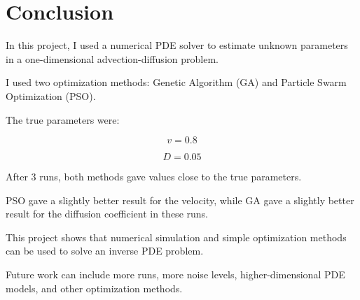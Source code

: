 \section{Conclusion}

In this project, I used a numerical PDE solver to estimate unknown parameters in a one-dimensional advection-diffusion problem.

I used two optimization methods: Genetic Algorithm (GA) and Particle Swarm Optimization (PSO).

The true parameters were:

\[
v = 0.8
\]

\[
D = 0.05
\]

After 3 runs, both methods gave values close to the true parameters.

PSO gave a slightly better result for the velocity, while GA gave a slightly better result for the diffusion coefficient in these runs.

This project shows that numerical simulation and simple optimization methods can be used to solve an inverse PDE problem.

Future work can include more runs, more noise levels, higher-dimensional PDE models, and other optimization methods.